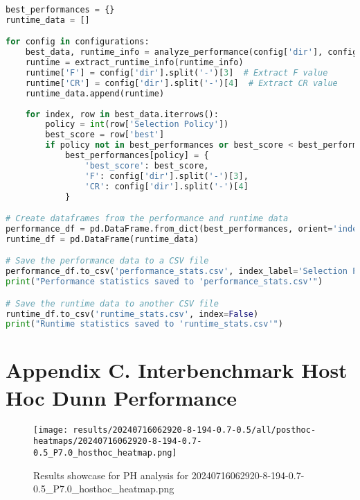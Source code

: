 \documentclass[12pt,a4paper]{article}
\begin{document}
\begin{lstlisting}[language=python, title=Showcase of implementation. Files are recorded using all\_stats.py.]
best_performances = {}
runtime_data = []

for config in configurations:
    best_data, runtime_info = analyze_performance(config['dir'], config['file'])
    runtime = extract_runtime_info(runtime_info)
    runtime['F'] = config['dir'].split('-')[3]  # Extract F value
    runtime['CR'] = config['dir'].split('-')[4]  # Extract CR value
    runtime_data.append(runtime)
    
    for index, row in best_data.iterrows():
        policy = int(row['Selection Policy'])
        best_score = row['best']
        if policy not in best_performances or best_score < best_performances[policy]['best_score']:
            best_performances[policy] = {
                'best_score': best_score,
                'F': config['dir'].split('-')[3],
                'CR': config['dir'].split('-')[4]
            }

# Create dataframes from the performance and runtime data
performance_df = pd.DataFrame.from_dict(best_performances, orient='index')
runtime_df = pd.DataFrame(runtime_data)

# Save the performance data to a CSV file
performance_df.to_csv('performance_stats.csv', index_label='Selection Policy')
print("Performance statistics saved to 'performance_stats.csv'")

# Save the runtime data to another CSV file
runtime_df.to_csv('runtime_stats.csv', index=False)
print("Runtime statistics saved to 'runtime_stats.csv'")    
\end{lstlisting}

\newpage

\section*{Appendix C. Interbenchmark Host Hoc Dunn Performance}
\begin{figure}[h]
    \centering
    \texttt{[image: results/20240716062920-8-194-0.7-0.5/all/posthoc-heatmaps/20240716062920-8-194-0.7-0.5\_P7.0\_hosthoc\_heatmap.png]}
    \caption{Results showcase for PH analysis for 20240716062920-8-194-0.7-0.5\_P7.0\_hosthoc\_heatmap.png} 
\end{figure}

\end{document}
